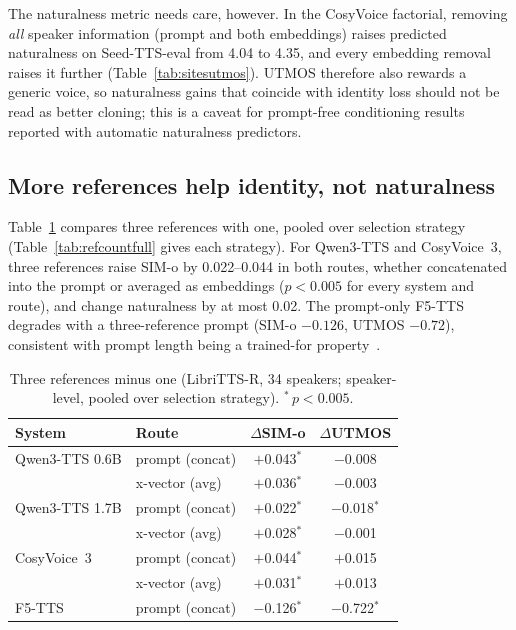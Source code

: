 \documentclass[10pt]{article}
\begin{document}
The naturalness metric needs care, however.
In the CosyVoice factorial, removing \emph{all} speaker information (prompt and both embeddings) raises predicted naturalness on Seed-TTS-eval from 4.04 to 4.35, and every embedding removal raises it further (Table~\ref{tab:sitesutmos}).
UTMOS therefore also rewards a generic voice, so naturalness gains that coincide with identity loss should not be read as better cloning; this is a caveat for prompt-free conditioning results reported with automatic naturalness predictors.

\subsection{More references help identity, not naturalness}
\label{sec:refcount}

Table~\ref{tab:refcount} compares three references with one, pooled over selection strategy (Table~\ref{tab:refcountfull} gives each strategy).
For Qwen3-TTS and CosyVoice~3, three references raise SIM-o by 0.022--0.044 in both routes, whether concatenated into the prompt or averaged as embeddings ($p{<}0.005$ for every system and route), and change naturalness by at most 0.02.
The prompt-only F5-TTS degrades with a three-reference prompt (SIM-o $-0.126$, UTMOS $-0.72$), consistent with prompt length being a trained-for property~\citep{megatts2}.

\begin{table}[t]
\centering
\caption{Three references minus one (LibriTTS-R, 34 speakers; speaker-level, pooled over selection strategy). $^\ast$\,$p{<}0.005$.}
\label{tab:refcount}
\small
\begin{tabular}{llcc}
\toprule
\textbf{System} & \textbf{Route} & $\Delta$\textbf{SIM-o} & $\Delta$\textbf{UTMOS} \\
\midrule
Qwen3-TTS 0.6B & prompt (concat) & $+$0.043$^\ast$ & $-$0.008 \\
               & x-vector (avg)  & $+$0.036$^\ast$ & $-$0.003 \\
Qwen3-TTS 1.7B & prompt (concat) & $+$0.022$^\ast$ & $-$0.018$^\ast$ \\
               & x-vector (avg)  & $+$0.028$^\ast$ & $-$0.001 \\
CosyVoice~3    & prompt (concat) & $+$0.044$^\ast$ & $+$0.015 \\
               & x-vector (avg)  & $+$0.031$^\ast$ & $+$0.013 \\
F5-TTS         & prompt (concat) & $-$0.126$^\ast$ & $-$0.722$^\ast$ \\
\bottomrule
\end{tabular}
\end{table}
\end{document}
